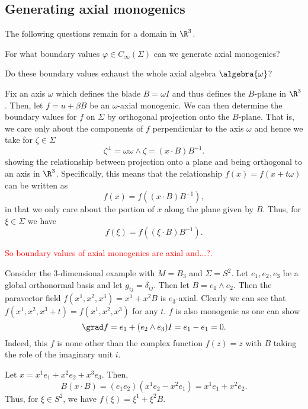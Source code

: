 \subsection{Generating axial monogenics}

The following questions remain for a domain in $\R^3$.

\begin{question}
    For what boundary values $\varphi \in C_\infty(\Sigma)$ can we generate axial monogenics?
\end{question}

\begin{question}
    Do these boundary values exhaust the whole axial algebra $\algebra{\omega}$?
\end{question}

Fix an axis $\omega$ which defines the blade $B = \omega I$ and thus defines the $B$-plane in $\R^3$.  Then, let $f=u+\beta B$ be an $\omega$-axial monogenic.  We can then determine the boundary values for $f$ on $\Sigma$ by orthogonal projection onto the $B$-plane.  That is, we care only about the components of $f$ perpendicular to the axis $\omega$ and hence we take for $\zeta \in \Sigma$
\[
\zeta^\perp = \omega \omega \wedge \zeta = (x\cdot B)B^{-1}.
\]
showing the relationship between projection onto a plane and being orthogonal to an axis in $\R^3$. Specifically, this means that the relationship $f(x)=f(x+t\omega)$ can be written as
\[
f(x)=f((x\cdot B)B^{-1}),
\]
in that we only care about the portion of $x$ along the plane given by $B$.  Thus, for $\xi \in \Sigma$ we have
\[
f(\xi) = f((\xi \cdot B)B^{-1}).
\]

\begin{figure}[H]
	\centering
	\resizebox{\columnwidth}{!}{}
\end{figure}

\textcolor{red}{So boundary values of axial monogenics are axial and...?.}

\begin{example}
    Consider the 3-dimensional example with $M=B_3$ and $\Sigma=S^2$.  Let $e_1,e_2,e_3$ be a global orthonormal basis and let $g_{ij}=\delta_{ij}$.  Then let $B=e_1 \wedge e_2$.  Then the paravector field $f(x^1,x^2,x^3)=x^1+x^2B$ is $e_3$-axial. Clearly we can see that $f(x^1,x^2,x^3+t)=f(x^1,x^2,x^3)$ for any $t$.  $f$ is also monogenic as one can show
    \[
        \grad f = e_1 + (e_2 \wedge e_3)I = e_1 - e_1 = 0.
    \]
    Indeed, this $f$ is none other than the complex function $f(z)=z$ with $B$ taking the role of the imaginary unit $i$. 

    Let $x=x^1e_1 + x^2e_2 + x^3e_3$.  Then, 
    \[
        B (x\cdot B) = (e_1e_2)( x^1e_2 -x^2 e_1 ) = x^1 e_1 + x^2 e_2.
    \] 
    Thus, for $\xi \in S^2$, we have $f(\xi)=\xi^1 +\xi^2 B$.
\end{example}

